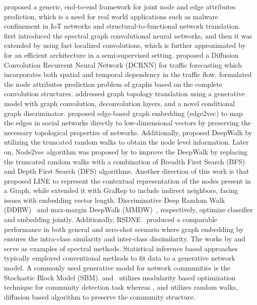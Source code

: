 \citet{guo2019deep} proposed a generic, end-to-end framework for joint node and edge attributes prediction, which is a need for real world applications such as malware confinement in IoT networks and structural-to-functional network translation. \citet{bruna2014spectral} first introduced the spectral graph convolutional neural networks, and then it was extended by \citet{defferrard2016convolutional} using fast localized convolutions, which is further approximated by~\citet{DBLP:conf/iclr/KipfW17} for an efficient architecture in a semi-supervised setting. \citet{li2018diffusion} proposed a Diffusion Convolution Recurrent Neural Network (DCRNN) for traffic forecasting which incorporates both spatial and temporal dependency in the traffic flow. \citet{Yu2018SpatioTemporalGC} formulated the node attributes prediction problem of graphs based on the complete convolution structures. \citet{9737289} addressed graph topology translation using a generative model with graph convolution, deconvolution layers, and a novel conditional graph discriminator. \citet{wang2020edge2vec} proposed edge-based graph embedding (edge2vec) to map the edges in social networks directly to low-dimensional vectors by preserving the necessary topological properties of networks. Additionally, \citet{perozzi2014deepwalk} proposed DeepWalk by utilizing the truncated random walks to obtain the node level information. Later on, Node2vec algorithm was proposed by \citet{grover2016node2vec} to improve the DeepWalk by replacing the truncated random walks with a combination of Breadth First Search (BFS) and Depth First Search (DFS) algorithms. Another direction of this work is that \citet{tang2015line} proposed LINE to represent the contextual representation of the nodes present in a Graph, while \citet{cao2015grarep} extended it with GraRep to include indirect neighbors, facing issues with embedding vector length. Discriminative Deep Random Walk (DDRW)~\cite{li2016discriminative} and max-margin DeepWalk (MMDW)~\cite{tu2016max}, respectively, optimize classifier and embedding jointly. Additionally, RSDNE~\cite{wang2018rsdne} produced a comparable performance in both general and zero-shot scenario where graph embedding by ensures the intra-class similarity and inter-class dissimilarity. The works by \citet{newman2006finding} and \citet{newman2013spectral} serve as examples of spectral methods. Statistical inference based approaches typically employed conventional methods to fit data to a generative network model. A commonly used generative model for  network communities is the Stochastic Block Model (SBM). \citet{clauset2005finding} and~\citet{lancichinetti2011limits} utilizes modularity based optimization technique for community detection task whereas \citet{reichardt2006statistical}, and \citet{rosvall2008maps} utilizes random walks, diffusion based algorithm to preserve the community structure.

